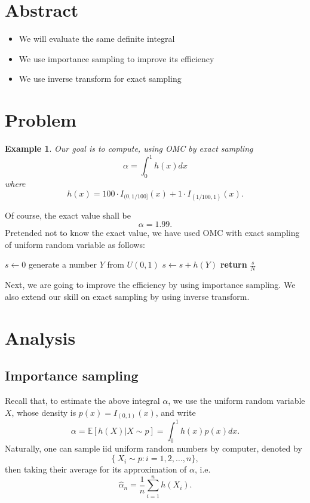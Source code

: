 \documentclass{article}
\newtheorem{example}{Example}
\begin{document}
\section{Abstract}

\begin{itemize}
 \item We will evaluate the same definite integral
 \item We use importance sampling to improve its efficiency
 \item We use inverse transform for exact sampling
\end{itemize}

\section{Problem}

\begin{example}\label{ex:integral}
Our goal is to compute, using OMC by exact sampling
$$\alpha = \int_0^1 h(x) dx$$
where
$$h(x) = 100 \cdot I_{(0, 1/100]}(x) + 1\cdot I_{(1/100, 1)} (x).$$
\end{example}
Of course, the exact value shall be 
$$\alpha = 1.99.$$
Pretended not to know the exact value, we have used OMC with exact sampling of uniform random variable as follows:

\begin{algorithm}
\caption{Integral by MC - Example \ref{ex:integral}}
\label{alg:mcpi}
\begin{algorithmic}[1]
\State  $s \gets 0$ 
	\State generate a number $Y$ from $U(0,1)$ 
	\State $s\gets s+h(Y)$ 
\EndFor
\State \textbf{return} $\frac{s}{N}$ 
\EndProcedure
\end{algorithmic}
\end{algorithm}

 

Next, we are going to improve the efficiency by using importance sampling. We also extend our skill on exact sampling by using inverse transform.

\section{Analysis}

\subsection{Importance sampling}
Recall that, to estimate the above integral $\alpha$, 
we use the uniform random variable $X$, 
whose density is $p(x) = I_{(0,1)}(x)$, and write
$$\alpha = \mathbb E[h(X) | X \sim p] = \int_{0}^{1} h(x) p(x) dx.$$
Naturally, one can sample iid uniform random numbers by computer, denoted by
$$\{\ X_i \sim p: i = 1, 2, \ldots, n\} ,$$
then taking their average for its approximation of $\alpha$, i.e.
$$\hat \alpha_n = \frac 1 n \sum_{i=1}^n h(X_i).$$
\end{document}
